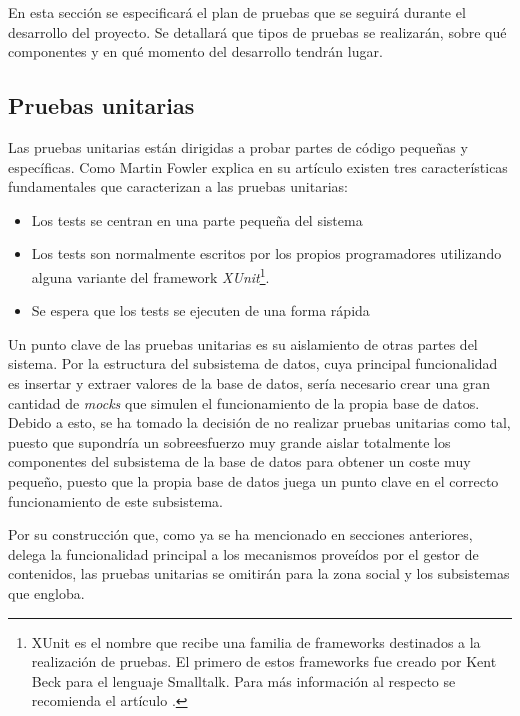 En esta sección se especificará el plan de pruebas que se seguirá durante el desarrollo del proyecto.  Se detallará que tipos de pruebas se realizarán, sobre qué componentes y en qué momento del desarrollo tendrán lugar.


\subsection{Pruebas unitarias}
Las pruebas unitarias están dirigidas a probar partes de código pequeñas y específicas. Como Martin Fowler explica en su artículo \cite{mfowler:unit-testing} existen tres características fundamentales que caracterizan a las pruebas unitarias:
\begin{itemize}
	\item Los tests se centran en una parte pequeña del sistema
	\item Los tests son normalmente escritos por los propios programadores utilizando alguna variante del framework \textit{XUnit}\footnote{XUnit es el nombre que recibe una familia de frameworks destinados a la realización de pruebas.  El primero de estos frameworks fue creado por Kent Beck para el lenguaje Smalltalk.  Para más información al respecto se recomienda el artículo \cite{mfowler:xunit}.}.
	\item Se espera que los tests se ejecuten de una forma rápida
\end{itemize}

Un punto clave de las pruebas unitarias es su aislamiento de otras partes del sistema.  Por la estructura del subsistema de datos, cuya principal funcionalidad es insertar y extraer valores de la base de datos, sería necesario crear una gran cantidad de \textit{mocks} que simulen el funcionamiento de la propia base de datos.  Debido a esto, se ha tomado la decisión de no realizar pruebas unitarias como tal, puesto que supondría un sobreesfuerzo muy grande aislar totalmente los componentes del subsistema de la base de datos para obtener un coste muy pequeño, puesto que la propia base de datos juega un punto clave en el correcto funcionamiento de este subsistema.

Por su construcción que, como ya se ha mencionado en secciones anteriores, delega la funcionalidad principal a los mecanismos proveídos por el gestor de contenidos, las pruebas unitarias se omitirán para la zona social y los subsistemas que engloba.

